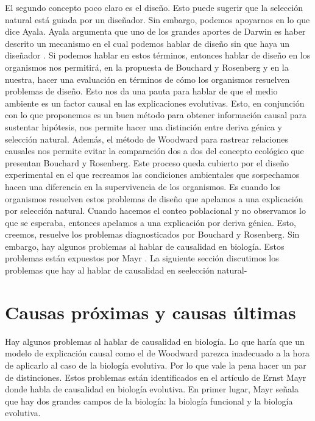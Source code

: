  El segundo concepto poco claro es el diseño. Esto puede sugerir que la selección natural está guiada por un diseñador. Sin embargo, podemos apoyarnos en lo que dice Ayala. Ayala argumenta que uno de los grandes aportes de Darwin es haber descrito un mecanismo en el cual podemos hablar de diseño sin que haya un diseñador \cite{Ayala2004}. Si podemos hablar en estos términos, entonces hablar de diseño en los organismos nos permitirá, en la propuesta de Bouchard y Rosenberg y en la nuestra, hacer una evaluación en términos de cómo los organismos resuelven problemas de diseño. Esto nos da una pauta para hablar de que el medio ambiente es un factor causal en las explicaciones evolutivas. Esto, en conjunción con lo que proponemos es un buen método para obtener información causal para sustentar hipótesis, nos permite hacer una distinción entre deriva génica y selección natural. Además, el método de Woodward para rastrear relaciones causales nos permite evitar la comparación dos a dos del concepto ecológico que presentan Bouchard y Rosenberg. Este proceso queda cubierto por el diseño experimental en el que recreamos las condiciones ambientales que sospechamos hacen una diferencia en la supervivencia de los organismos. Es cuando los organismos resuelven estos problemas de diseño que apelamos a una explicación por selección natural. Cuando hacemos el conteo poblacional y no observamos lo que se esperaba, entonces apelamos a una explicación por deriva génica. Esto, creemos, resuelve los problemas diagnosticados por Bouchard y Rosenberg. Sin embargo, hay algunos problemas al hablar de causalidad en biología. Estos problemas están expuestos por Mayr \citeyear{Mayr1998}. La siguiente sección discutimos los problemas que hay al hablar de causalidad en seelección natural-

\section{Causas próximas y causas últimas}

Hay algunos problemas al hablar de causalidad en biología. Lo que haría que un modelo de explicación causal como el de Woodward parezca inadecuado a la hora de aplicarlo al caso de la biología evolutiva. Por lo que vale la pena hacer un par de distinciones. Estos problemas están identificados en el artículo de Ernst Mayr \citeyear{Mayr1998} donde habla de causalidad en biología evolutiva. En primer lugar, Mayr señala que hay dos grandes campos de la biología: la biología funcional y la biología evolutiva.

